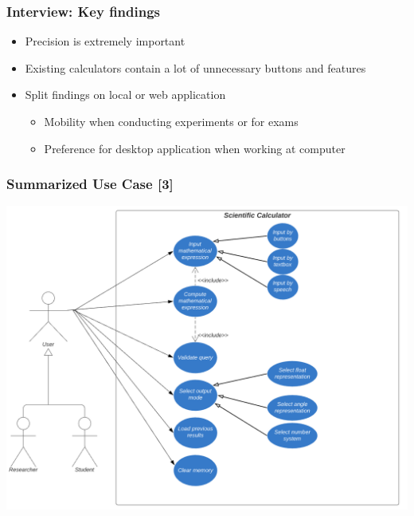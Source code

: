 \documentclass{beamer}
\begin{document}
\begin{frame}
\frametitle{Interview: Key findings}
\begin{itemize}
 \item Precision is extremely important
 \item Existing calculators contain a lot of unnecessary buttons and features
 \item Split findings on local or web application
  \begin{itemize}
   \item Mobility when conducting experiments or for exams
   \item Preference for desktop application when working at computer
  \end{itemize}
\end{itemize}
\end{frame}


\begin{frame}
\frametitle{Summarized Use Case [3]}
\includegraphics[scale=0.5]{Use Case}
\end{frame}
\end{document}
